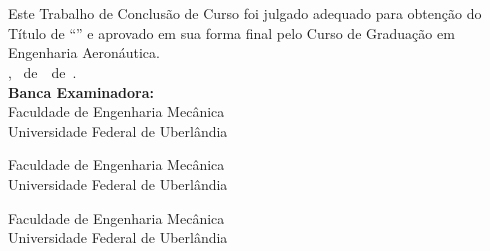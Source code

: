\imprimircapa


 \imprimirfolhaderosto

% 	

\begin{folhadeaprovacao}
	\OnehalfSpacing
	\centering
	\imprimirautor\\%
	\vspace{24pt}		
	\textbf{\imprimirtitulo}%
	\ifnotempty{\imprimirsubtitulo}{:~\imprimirsubtitulo}\\%
	\vspace*{31.5pt}%
	\vspace*{\baselineskip}
	Este Trabalho de Conclusão de Curso foi julgado adequado para obtenção do Título de ``\imprimirformacao'' e aprovado em sua forma final pelo Curso de Graduação em Engenharia Aeronáutica.\\
	\vspace{12pt}
	\imprimirlocal, \imprimirdia~de~\imprimirmes~de~\imprimirano.\\
	
	\vspace*{24pt}
	\textbf{Banca Examinadora:}\\
	
	\vspace*{24pt}
	\assinatura{\OnehalfSpacing \imprimirbancaa }
	\vspace{6pt}
	Faculdade de Engenharia Mecânica\\Universidade Federal de Uberlândia
	
	\vspace*{24pt}
	\assinatura{\OnehalfSpacing \imprimirbancab}
	\vspace{6pt}
	Faculdade de Engenharia Mecânica\\Universidade Federal de Uberlândia
	
	\vspace*{24pt}
	\assinatura{\OnehalfSpacing \imprimirbancac}
	\vspace{6pt}
	Faculdade de Engenharia Mecânica\\Universidade Federal de Uberlândia
	
\end{folhadeaprovacao}

